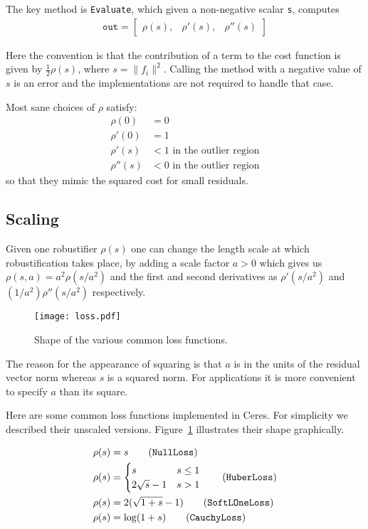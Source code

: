 The key method is \texttt{Evaluate}, which given a non-negative scalar \texttt{s}, computes
\begin{align}
	\texttt{out} = \begin{bmatrix}\rho(s), & \rho'(s), & \rho''(s)\end{bmatrix}
\end{align}

Here the convention is that the contribution of a term to the cost function is given by $\frac{1}{2}\rho(s)$,  where $s = \|f_i\|^2$. Calling the method with a negative value of $s$ is an error and the implementations are not required to handle that case.

Most sane choices of $\rho$ satisfy:
\begin{align}
   \rho(0) &= 0\\
   \rho'(0) &= 1\\
   \rho'(s) &< 1 \text{ in the outlier region}\\
   \rho''(s) &< 0 \text{ in the outlier region}
\end{align}
so that they mimic the squared cost for small residuals.

\subsection{Scaling}
Given one robustifier $\rho(s)$
 one can change the length scale at which robustification takes
 place, by adding a scale factor $a > 0$ which gives us $\rho(s,a) = a^2 \rho(s / a^2)$ and the first and second derivatives as $\rho'(s / a^2)$ and   $(1 / a^2) \rho''(s / a^2)$ respectively. 


\begin{figure}[hbt]
\texttt{[image: loss.pdf]}
\caption{Shape of the various common loss functions.}
\label{fig:loss}
\end{figure}


The reason for the appearance of squaring is that $a$ is in the units of the residual vector norm whereas $s$ is a squared norm. For applications it is more convenient to specify $a$ than
its square. 

Here are some common loss functions implemented in Ceres. For simplicity we described their unscaled versions. Figure~\ref{fig:loss} illustrates their shape graphically.

\begin{align}
		\rho(s)&=s \tag{\texttt{NullLoss}}\\
		\rho(s) &= \begin{cases}
		       s & s \le 1\\
		       2 \sqrt{s} - 1 & s > 1
	           \end{cases} \tag{\texttt{HuberLoss}}\\
		\rho(s) &= 2 (\sqrt{1+s} - 1) \tag{\texttt{SoftLOneLoss}}\\
		\rho(s) &= \log(1 + s) \tag{\texttt{CauchyLoss}}
\end{align}

